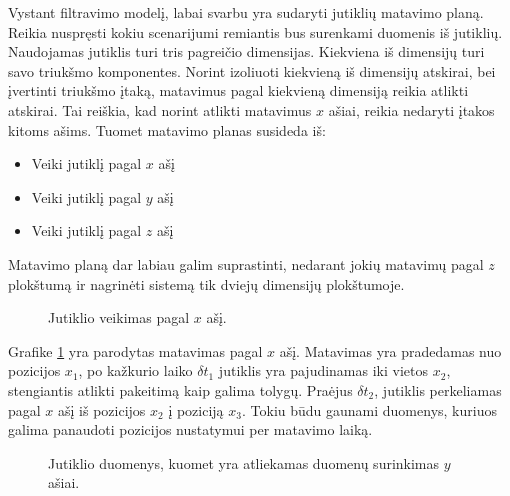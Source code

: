 Vystant filtravimo modelį, labai svarbu yra sudaryti jutiklių matavimo planą.
Reikia nuspręsti kokiu scenarijumi remiantis bus surenkami duomenis iš jutiklių.
Naudojamas jutiklis turi tris pagreičio dimensijas.
Kiekviena iš dimensijų turi savo triukšmo komponentes.
Norint izoliuoti kiekvieną iš dimensijų atskirai, bei įvertinti triukšmo įtaką, matavimus pagal kiekvieną dimensiją reikia atlikti atskirai.
Tai reiškia, kad norint atlikti matavimus $x$ ašiai, reikia nedaryti įtakos kitoms ašims.
Tuomet matavimo planas susideda iš:

\begin{itemize}
    \item Veiki jutiklį pagal $x$ ašį
    \item Veiki jutiklį pagal $y$ ašį
    \item Veiki jutiklį pagal $z$ ašį
\end{itemize}

Matavimo planą dar labiau galim suprastinti, nedarant jokių matavimų pagal $z$ plokštumą ir nagrinėti sistemą tik dviejų dimensijų plokštumoje. 

\begin{figure}[H]
    \centering
    \caption{Jutiklio veikimas pagal $x$ ašį.}
    \label{tikz:x_axis_acceleration_measurement}
\end{figure}

Grafike \ref{tikz:x_axis_acceleration_measurement} yra parodytas matavimas pagal $x$ ašį.
Matavimas yra pradedamas nuo pozicijos $x_1$, po kažkurio laiko $\delta t_1$ jutiklis yra pajudinamas iki vietos $x_2$, stengiantis atlikti pakeitimą kaip galima tolygų.
Praėjus $\delta t_2$, jutiklis perkeliamas pagal $x$ ašį iš pozicijos $x_2$ į poziciją $x_3$.
Tokiu būdu gaunami duomenys, kuriuos galima panaudoti pozicijos nustatymui per matavimo laiką.

\begin{figure}[H]
    \centering
    \caption{Jutiklio duomenys, kuomet yra atliekamas duomenų surinkimas $y$ ašiai.}
    \label{tikz:y_axis_acceleration_measurement}
\end{figure}

